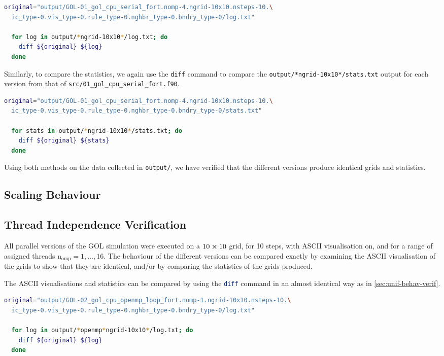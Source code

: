 \documentclass[]{article}
\begin{document}
\begin{lstlisting}[language=Bash]
  original="output/GOL-01_gol_cpu_serial_fort.nomp-4.ngrid-10x10.nsteps-10.\
  ic_type-0.vis_type-0.rule_type-0.nghbr_type-0.bndry_type-0/log.txt"

  for log in output/*ngrid-10x10*/log.txt; do
    diff ${original} ${log}
  done
\end{lstlisting}

Similarly, to compare the statistics, we again use the \lstinline{diff} command
to compare the \lstinline[style=ff]{output/*ngrid-10x10*/stats.txt} output
for each version from that of
\lstinline[style=ff]{src/01_gol_cpu_serial_fort.f90}.

\begin{lstlisting}[language=Bash]
  original="output/GOL-01_gol_cpu_serial_fort.nomp-4.ngrid-10x10.nsteps-10.\
  ic_type-0.vis_type-0.rule_type-0.nghbr_type-0.bndry_type-0/stats.txt"

  for stats in output/*ngrid-10x10*/stats.txt; do
    diff ${original} ${stats}
  done
\end{lstlisting}

Using both methods on the data collected in \lstinline[style=ff]{output/}, we
have verified that the different versions produce identical grids and
statistics.

\subsection{Scaling Behaviour}
\label{sec:scaling-behaviour}

\subsection{Thread Independence Verification}
\label{sec:thre-indep-verif}

All parallel versions of the GOL simulation were executed on a $10 \cross 10$
grid, for 10 steps, with ASCII visualisation on, and for a range of assigned
threads $\mathrm{n_{omp}} = 1, \dotsc, 16$.
The behaviour of the different versions can be compared exactly by examining the
ASCII visualisation of the grids to show that they are identical, and/or by
comparing the statistics of the grids produced.

The ASCII visualisations and statistics can be compared by using the
\lstinline[language=Bash]{diff} command in an almost identical way as in
\autoref{sec:unif-behav-verif}.

\begin{lstlisting}[language=Bash]
  original="output/GOL-02_gol_cpu_openmp_loop_fort.nomp-1.ngrid-10x10.nsteps-10.\
  ic_type-0.vis_type-0.rule_type-0.nghbr_type-0.bndry_type-0/log.txt"

  for log in output/*openmp*ngrid-10x10*/log.txt; do
    diff ${original} ${log}
  done
\end{lstlisting}
\end{document}
